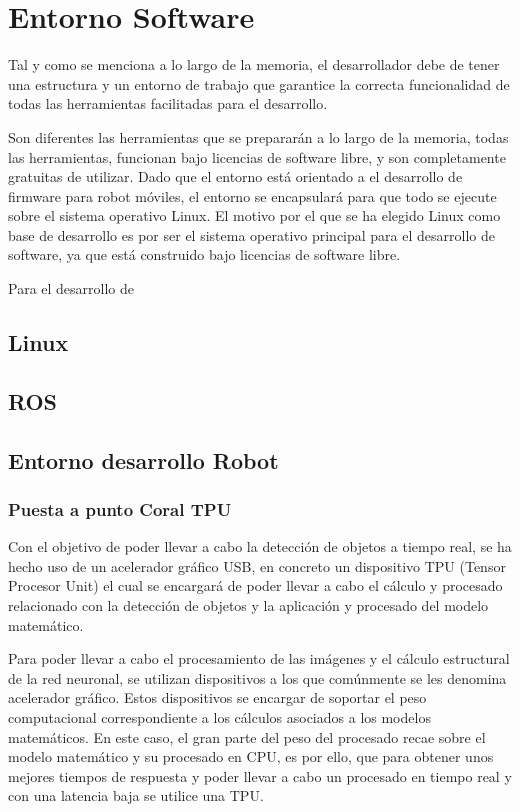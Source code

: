 \chapter{Entorno Software}\label{cap:planificación}
Tal y como se menciona a lo largo de la memoria, el desarrollador debe de tener una estructura y un entorno de trabajo que garantice la correcta funcionalidad de todas las herramientas facilitadas para el desarrollo. 

Son diferentes las herramientas que se prepararán a lo largo de la memoria, todas las herramientas, funcionan bajo licencias de software libre, y son completamente gratuitas de utilizar. Dado que el entorno está orientado a el desarrollo de firmware para robot móviles, el entorno se encapsulará para que todo se ejecute sobre el sistema operativo Linux. El motivo por el que se ha elegido Linux como base de desarrollo es por ser el sistema operativo principal para el desarrollo de software, ya que está construido bajo licencias de software libre.

Para el desarrollo de 
\section{Linux}
\section{ROS}
\section{Entorno desarrollo Robot}

\subsection{Puesta a punto Coral TPU}

Con el objetivo de poder llevar a cabo la detección de objetos a tiempo real, se ha hecho uso de un acelerador gráfico USB, en concreto un dispositivo TPU (Tensor Procesor Unit) el cual se encargará de poder llevar a cabo el cálculo y procesado relacionado con la detección de objetos y la aplicación y procesado del modelo matemático.

Para poder llevar a cabo el procesamiento de las imágenes y el cálculo estructural de la red neuronal, se utilizan dispositivos a los que comúnmente se les denomina acelerador gráfico. Estos dispositivos se encargar de soportar el peso computacional correspondiente a los cálculos asociados a los modelos matemáticos. En este caso, el gran parte del peso del procesado recae sobre el modelo matemático y su procesado en CPU, es por ello, que para obtener unos mejores tiempos de respuesta y poder llevar a cabo un procesado en tiempo real y con una latencia baja se utilice una TPU.


